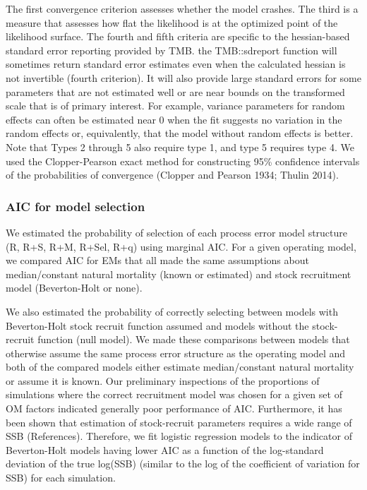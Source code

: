 \documentclass[
  12pt,
]{article}
\begin{document}
The first convergence criterion assesses whether the model crashes. The
third is a measure that assesses how flat the likelihood is at the
optimized point of the likelihood surface. The fourth and fifth criteria
are specific to the hessian-based standard error reporting provided by
TMB. the TMB::sdreport function will sometimes return standard error
estimates even when the calculated hessian is not invertible (fourth
criterion). It will also provide large standard errors for some
parameters that are not estimated well or are near bounds on the
transformed scale that is of primary interest. For example, variance
parameters for random effects can often be estimated near 0 when the fit
suggests no variation in the random effects or, equivalently, that the
model without random effects is better. Note that Types 2 through 5 also
require type 1, and type 5 requires type 4. We used the Clopper-Pearson
exact method for constructing 95\% confidence intervals of the
probabilities of convergence (Clopper and Pearson 1934; Thulin 2014).

\hypertarget{aic-for-model-selection}{%
\subsubsection*{AIC for model selection}\label{aic-for-model-selection}}

We estimated the probability of selection of each process error model
structure (R, R+S, R+M, R+Sel, R+q) using marginal AIC. For a given
operating model, we compared AIC for EMs that all made the same
assumptions about median/constant natural mortality (known or estimated)
and stock recruitment model (Beverton-Holt or none).

We also estimated the probability of correctly selecting between models
with Beverton-Holt stock recruit function assumed and models without the
stock-recruit function (null model). We made these comparisons between
models that otherwise assume the same process error structure as the
operating model and both of the compared models either estimate
median/constant natural mortality or assume it is known. Our preliminary
inspections of the proportions of simulations where the correct
recruitment model was chosen for a given set of OM factors indicated
generally poor performance of AIC. Furthermore, it has been shown that
estimation of stock-recruit parameters requires a wide range of SSB
(References). Therefore, we fit logistic regression models to the
indicator of Beverton-Holt models having lower AIC as a function of the
log-standard deviation of the true log(SSB) (similar to the log of the
coefficient of variation for SSB) for each simulation.
\end{document}
